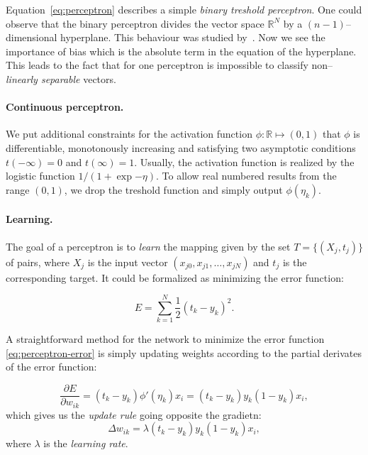 Equation~\ref{eq:perceptron} describes a simple \emph{binary treshold perceptron}. One could observe that the binary perceptron divides the vector space $\mathbb{R}^N$ by a $(n-1)$--dimensional hyperplane. This behaviour was studied by~\citet{rosenblatt1958perceptron}. Now we see the importance of bias which is the absolute term in the equation of the hyperplane. \label{sec:linear-sep} This leads to the fact that for one perceptron is impossible to classify non--\emph{linearly separable} vectors. 

\paragraph{Continuous perceptron.}
We put additional constraints for the activation function $\phi : \mathbb{R} \mapsto (0,1)$ that $\phi$ is differentiable, monotonously increasing and satisfying two asymptotic conditions $t(-\infty)=0$ and $t(\infty)=1$.  Usually, the activation function is realized by the logistic function $1 / (1 + \exp{-\eta})$. To allow real numbered results from the range $(0,1)$, we drop the treshold function and simply output $\phi(\eta_k)$. 

\paragraph{Learning.} 
The goal of a perceptron is to \emph{learn} the mapping given by the set $T = \{(X_j, t_j)\}$ of pairs, where $X_j$ is the input vector $(x_{j0},x_{j1}, \ldots, x_{jN})$ and $t_j$ is the corresponding target. It could be formalized as minimizing the error function: 

\begin{equation}
\label{eq:perceptron-error} 
E = \sum_{k=1}^{N} \frac{1}{2}(t_k-y_k)^2.
\end{equation} 

A straightforward method for the network to minimize the error function \ref{eq:perceptron-error} is simply updating weights according to the partial derivates of the error function: 

\begin{equation}
\label{eq:perceptron-learning} 
\frac{\partial E}{\partial w_{ik}} = (t_k - y_k)\phi'(\eta_k)x_i = (t_k - y_k)y_k(1 - y_k)x_i,
\end{equation} 
which gives us the \emph{update rule} going opposite the gradietn: 
\
\begin{equation} 
\label{eq:perceptron-learning-rule} 
\Delta w_{ik} = \lambda (t_k - y_k)y_k(1 - y_k)x_i,
\end{equation} 
where $\lambda$ is the \emph{learning rate}. 

